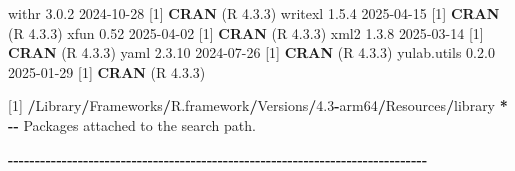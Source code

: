 \documentclass[
]{article}
\newenvironment{Shaded}{\begin{snugshade}}{\end{snugshade}}
\newcommand{\DecValTok}[1]{\textcolor[rgb]{0.00,0.00,0.81}{#1}}
\newcommand{\FloatTok}[1]{\textcolor[rgb]{0.00,0.00,0.81}{#1}}
\newcommand{\FunctionTok}[1]{\textcolor[rgb]{0.13,0.29,0.53}{\textbf{#1}}}
\newcommand{\NormalTok}[1]{#1}
\newcommand{\SpecialCharTok}[1]{\textcolor[rgb]{0.81,0.36,0.00}{\textbf{#1}}}
\begin{document}
\begin{Shaded}
\begin{Highlighting}[]
\NormalTok{ withr           }\DecValTok{3}\NormalTok{.}\FloatTok{0.2}   \DecValTok{2024{-}10{-}28}\NormalTok{ [}\DecValTok{1}\NormalTok{] }\FunctionTok{CRAN}\NormalTok{ (R }\DecValTok{4}\NormalTok{.}\FloatTok{3.3}\NormalTok{)}
\NormalTok{ writexl         }\DecValTok{1}\NormalTok{.}\FloatTok{5.4}   \DecValTok{2025{-}04{-}15}\NormalTok{ [}\DecValTok{1}\NormalTok{] }\FunctionTok{CRAN}\NormalTok{ (R }\DecValTok{4}\NormalTok{.}\FloatTok{3.3}\NormalTok{)}
\NormalTok{ xfun            }\FloatTok{0.52}    \DecValTok{2025{-}04{-}02}\NormalTok{ [}\DecValTok{1}\NormalTok{] }\FunctionTok{CRAN}\NormalTok{ (R }\DecValTok{4}\NormalTok{.}\FloatTok{3.3}\NormalTok{)}
\NormalTok{ xml2            }\DecValTok{1}\NormalTok{.}\FloatTok{3.8}   \DecValTok{2025{-}03{-}14}\NormalTok{ [}\DecValTok{1}\NormalTok{] }\FunctionTok{CRAN}\NormalTok{ (R }\DecValTok{4}\NormalTok{.}\FloatTok{3.3}\NormalTok{)}
\NormalTok{ yaml            }\DecValTok{2}\NormalTok{.}\FloatTok{3.10}  \DecValTok{2024{-}07{-}26}\NormalTok{ [}\DecValTok{1}\NormalTok{] }\FunctionTok{CRAN}\NormalTok{ (R }\DecValTok{4}\NormalTok{.}\FloatTok{3.3}\NormalTok{)}
\NormalTok{ yulab.utils     }\DecValTok{0}\NormalTok{.}\FloatTok{2.0}   \DecValTok{2025{-}01{-}29}\NormalTok{ [}\DecValTok{1}\NormalTok{] }\FunctionTok{CRAN}\NormalTok{ (R }\DecValTok{4}\NormalTok{.}\FloatTok{3.3}\NormalTok{)}

\NormalTok{ [}\DecValTok{1}\NormalTok{] }\SpecialCharTok{/}\NormalTok{Library}\SpecialCharTok{/}\NormalTok{Frameworks}\SpecialCharTok{/}\NormalTok{R.framework}\SpecialCharTok{/}\NormalTok{Versions}\SpecialCharTok{/}\FloatTok{4.3}\SpecialCharTok{{-}}\NormalTok{arm64}\SpecialCharTok{/}\NormalTok{Resources}\SpecialCharTok{/}\NormalTok{library}
 \SpecialCharTok{*} \SpecialCharTok{{-}{-}}\NormalTok{ Packages attached to the search path.}

\SpecialCharTok{{-}{-}{-}{-}{-}{-}{-}{-}{-}{-}{-}{-}{-}{-}{-}{-}{-}{-}{-}{-}{-}{-}{-}{-}{-}{-}{-}{-}{-}{-}{-}{-}{-}{-}{-}{-}{-}{-}{-}{-}{-}{-}{-}{-}{-}{-}{-}{-}{-}{-}{-}{-}{-}{-}{-}{-}{-}{-}{-}{-}{-}{-}{-}{-}{-}{-}{-}{-}{-}{-}{-}{-}{-}{-}{-}{-}{-}{-}}
\end{Highlighting}
\end{Shaded}
\end{document}
